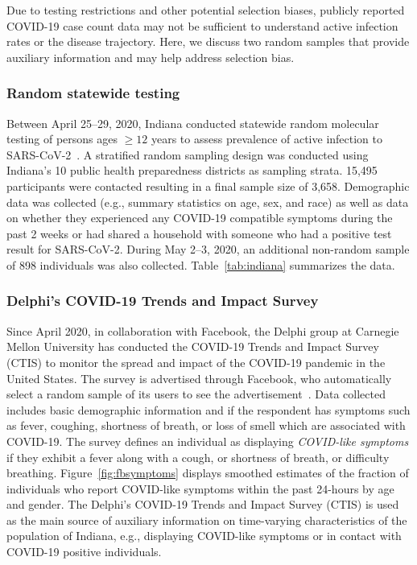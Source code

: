 \documentclass[11pt]{amsart}
\numberwithin{equation}{section}
\theoremstyle{plain}
\begin{document}
 Due to testing restrictions and other potential selection biases, publicly reported COVID-19 case count data may not be sufficient to understand active infection rates or the disease trajectory.  Here, we discuss two random samples that provide auxiliary information and may help address selection bias.

 \subsubsection{Random statewide testing}

 Between April 25--29, 2020, Indiana conducted statewide random molecular testing of persons ages $\geq 12$ years to assess prevalence of active infection to SARS-CoV-2~\citep{Yiannoutsos2021}. A stratified random sampling design was conducted using Indiana’s 10 public health preparedness districts as sampling strata. 15,495 participants were contacted resulting in a final sample size of 3,658. Demographic data was collected (e.g., summary statistics on age, sex, and race) as well as data on whether they experienced any COVID-19 compatible symptoms during the past 2 weeks or had shared a household with someone who had a positive test result for SARS-CoV-2. During May 2--3, 2020, an additional non-random sample of 898 individuals was also collected.
 Table~\ref{tab:indiana} summarizes the data.

 \subsubsection{Delphi's COVID-19 Trends and Impact Survey}
 \label{subsection:fbsymptom}
 Since April 2020, in collaboration with Facebook, the Delphi group at Carnegie Mellon University has conducted the COVID-19 Trends and Impact Survey (CTIS) to monitor the spread and impact of the COVID-19 pandemic in the United States.  The survey is advertised through Facebook, who automatically select a random sample of its users to see the advertisement~\citep{doi:10.1073/pnas.2111454118}.  Data collected includes basic demographic information and if the respondent has symptoms such as fever, coughing, shortness of breath, or loss of smell which are associated with COVID-19.  The survey defines an individual as displaying \emph{COVID-like symptoms} if they exhibit a fever along with a cough, or shortness of breath, or difficulty breathing.  Figure~\ref{fig:fbsymptoms} displays smoothed estimates of the fraction of individuals who report COVID-like symptoms within the past 24-hours by age and gender.  The Delphi's COVID-19 Trends and Impact Survey (CTIS) is used as the main source of auxiliary information on time-varying characteristics of the population of Indiana, e.g., displaying COVID-like symptoms or in contact with COVID-19 positive individuals.
\end{document}
